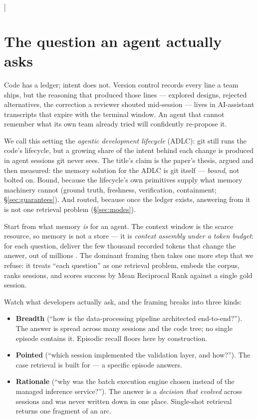 \documentclass[twocolumn,10pt]{article}
\begin{document}
\vspace{1.2em}
]

\section{The question an agent actually asks}\label{sec:question}

Code has a ledger; intent does not. Version control records every line a team ships, but the reasoning that produced those lines --- explored designs, rejected alternatives, the correction a reviewer shouted mid-session --- lives in AI-assistant transcripts that expire with the terminal window. An agent that cannot remember what its own team already tried will confidently re-propose it.

We call this setting the \emph{agentic development lifecycle} (ADLC): git still runs the code's lifecycle, but a growing share of the intent behind each change is produced in agent sessions git never sees. The title's claim is the paper's thesis, argued and then measured: the memory solution for the ADLC is git itself --- \emph{bound}, not bolted on. Bound, because the lifecycle's own primitives supply what memory machinery cannot (ground truth, freshness, verification, containment; \S\ref{sec:guarantees}). And routed, because once the ledger exists, answering from it is not one retrieval problem (\S\ref{sec:modes}).

Start from what memory \emph{is} for an agent. The context window is the scarce resource, so memory is not a store --- it is \emph{context assembly under a token budget}: for each question, deliver the few thousand recorded tokens that change the answer, out of millions \citep{rise2026}. The dominant framing then takes one more step that we refuse: it treats ``each question'' as one retrieval problem, embeds the corpus, ranks sessions, and scores success by Mean Reciprocal Rank against a single gold session.

Watch what developers actually ask, and the framing breaks into three kinds:
\begin{itemize}\itemsep2pt
  \item \textbf{Breadth} (``how is the data-processing pipeline architected end-to-end?''). The answer is spread across many sessions and the code tree; no single episode contains it. Episodic recall floors here by construction.
  \item \textbf{Pointed} (``which session implemented the validation layer, and how?''). The case retrieval is built for --- a specific episode answers.
  \item \textbf{Rationale} (``why was the batch execution engine chosen instead of the managed inference service?''). The answer is a \emph{decision that evolved} across sessions and was never written down in one place. Single-shot retrieval returns one fragment of an arc.
\end{itemize}
\end{document}
